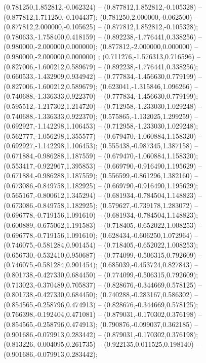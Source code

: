  (0.781250,1.852812,-0.062324) -- (0.877812,1.852812,-0.105328) -- (0.877812,1.711250,-0.104437);
 (0.781250,2.000000,-0.062500) -- (0.877812,2.000000,-0.105625) -- (0.877812,1.852812,-0.105328);
 (0.780633,-1.758400,0.418159) -- (0.892238,-1.776441,0.338256) -- (0.980000,-2.000000,0.000000);
 (0.877812,-2.000000,0.000000) -- (0.980000,-2.000000,0.000000) ;
 (0.711276,-1.576313,0.716596) -- (0.827006,-1.600212,0.589679) -- (0.892238,-1.776441,0.338256);
 (0.660533,-1.432909,0.934942) -- (0.777834,-1.456630,0.779199) -- (0.827006,-1.600212,0.589679);
 (0.623041,-1.315846,1.096266) -- (0.740688,-1.336333,0.922370) -- (0.777834,-1.456630,0.779199);
 (0.595512,-1.217302,1.214720) -- (0.712958,-1.233030,1.029248) -- (0.740688,-1.336333,0.922370);
 (0.575865,-1.132025,1.299259) -- (0.692927,-1.142298,1.106453) -- (0.712958,-1.233030,1.029248);
 (0.562777,-1.056298,1.355577) -- (0.679470,-1.060884,1.158320) -- (0.692927,-1.142298,1.106453);
 (0.555438,-0.987345,1.387158) -- (0.671884,-0.986288,1.187559) -- (0.679470,-1.060884,1.158320);
 (0.553417,-0.922967,1.395853) -- (0.669790,-0.916490,1.195629) -- (0.671884,-0.986288,1.187559);
 (0.556599,-0.861296,1.382160) -- (0.673086,-0.849758,1.182925) -- (0.669790,-0.916490,1.195629);
 (0.565167,-0.800612,1.345294) -- (0.681934,-0.784504,1.148823) -- (0.673086,-0.849758,1.182925);
 (0.579627,-0.739178,1.283072) -- (0.696778,-0.719156,1.091610) -- (0.681934,-0.784504,1.148823);
 (0.600889,-0.675062,1.191583) -- (0.718405,-0.652022,1.008253) -- (0.696778,-0.719156,1.091610);
 (0.628434,-0.606250,1.072964) -- (0.746075,-0.581284,0.901454) -- (0.718405,-0.652022,1.008253);
 (0.656730,-0.532410,0.950687) -- (0.774099,-0.506315,0.792609) -- (0.746075,-0.581284,0.901454);
 (0.685039,-0.453724,0.827843) -- (0.801738,-0.427330,0.684450) -- (0.774099,-0.506315,0.792609);
 (0.713023,-0.370489,0.705837) -- (0.828676,-0.344669,0.578125) -- (0.801738,-0.427330,0.684450);
 (0.740288,-0.283167,0.586302) -- (0.854565,-0.258796,0.474913) -- (0.828676,-0.344669,0.578125);
 (0.766398,-0.192404,0.471081) -- (0.879031,-0.170302,0.376198) -- (0.854565,-0.258796,0.474913);
 (0.790876,-0.099037,0.362185) -- (0.901686,-0.079913,0.283442) -- (0.879031,-0.170302,0.376198);
 (0.813226,-0.004095,0.261735) -- (0.922135,0.011525,0.198140) -- (0.901686,-0.079913,0.283442);

